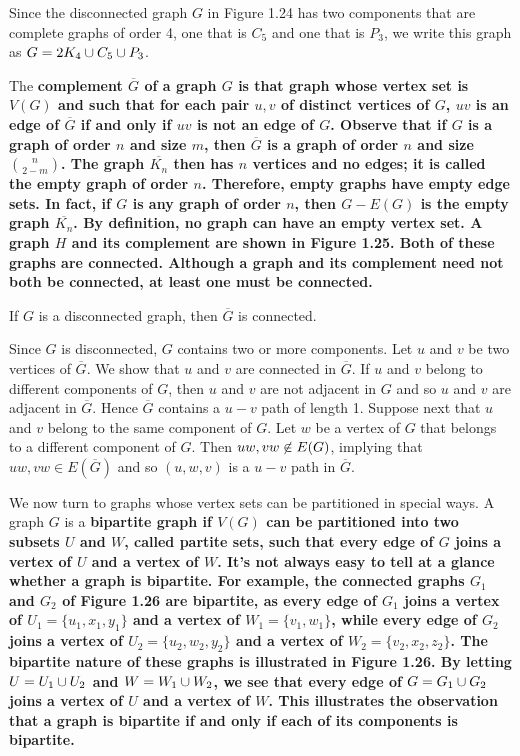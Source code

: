 

Since the disconnected graph $G$ in Figure 1.24 has two components that are complete graphs of order 4, one that is $C_{5}$ and one that is $P_{3}$, we write this graph as $G = 2K_{4} \cup C_{5} \cup P_{3}$.



The \bf{complement} $\overline{G}$ of a graph $G$ is that graph whose vertex set is $V(G)$ and such that for each pair $u,v$ of distinct vertices of $G$, $uv$ is an edge of $\overline{G}$ if and only if $uv$ is not an edge of $G$. Observe that if $G$ is a graph of order $n$ and size $m$, then $\overline{G}$ is a graph of order $n$ and size $n \choose 2 - m$. The graph $\overline{K_{n}}$ then has $n$ vertices and no edges; it is called the \bf{empty graph} of order $n$. Therefore, empty graphs have empty edge sets. In fact, if $G$ is any graph of order $n$, then $G-E(G)$ is the empty graph $\overline{K_{n}}$. By definition, no graph can have an empty vertex set. A graph $H$ and its complement are shown in Figure 1.25. Both of these graphs are connected. Although a graph and its complement need not both be connected, at least one must be connected.



\begin{thm}
If $G$ is a disconnected graph, then $\overline{G}$ is connected.
\end{thm}

\begin{pf}
Since $G$ is disconnected, $G$ contains two or more components. Let $u$ and $v$ be two vertices of $\overline{G}$. We show that $u$ and $v$ are connected in $\overline{G}$. If $u$ and $v$ belong to different components of $G$, then $u$ and $v$ are not adjacent in $G$ and so $u$ and $v$ are adjacent in $\overline{G}$. Hence $\overline{G}$ contains a $u-v$ path of length 1. Suppose next that $u$ and $v$ belong to the same component of $G$. Let $w$ be a vertex of $G$ that belongs to a different component of $G$. Then $uw,vw \centernot\in E(G)$, implying that $uw,vw \in E(\overline{G})$ and so $(u,w,v)$ is a $u-v$ path in $\overline{G}$.
\end{pf}

We now turn to graphs whose vertex sets can be partitioned in special ways. A graph $G$ is a \bf{bipartite graph} if $V(G)$ can be partitioned into two subsets $U$ and $W$, called \bf{partite sets}, such that every edge of $G$ joins a vertex of $U$ and a vertex of $W$. It's not always easy to tell at a glance whether a graph is bipartite. For example, the connected graphs $G_{1}$ and $G_{2}$ of Figure 1.26 are bipartite, as every edge of $G_{1}$ joins a vertex of $U_{1} = \{u_{1},x_{1},y_{1}\}$ and a vertex of $W_{1} = \{v_{1},w_{1}\}$, while every edge of $G_{2}$ joins a vertex of $U_{2} = \{u_{2},w_{2},y_{2}\}$ and a vertex of $W_{2} = \{v_{2},x_{2},z_{2}\}$. The bipartite nature of these graphs is illustrated in Figure 1.26. By letting $U = U_{1} \cup U_{2}$ and $W = W_{1} \cup W_{2}$, we see that every edge of $G = G_{1} \cup G_{2}$ joins a vertex of $U$ and a vertex of $W$. This illustrates the observation that a graph is bipartite if and only if each of its components is bipartite.

